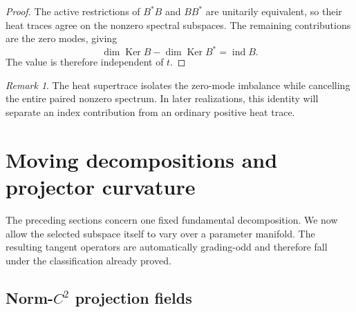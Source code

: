 \documentclass[11pt,reqno]{scrartcl}
\DeclareMathOperator{\Ker}{Ker}
\DeclareMathOperator{\ind}{ind}
\theoremstyle{plain}
\theoremstyle{definition}
\theoremstyle{remark}
\newtheorem{remark}[remark]{Remark}
\begin{document}
\begin{proof}
The active restrictions of \(B^*B\) and \(BB^*\) are unitarily equivalent,
so their heat traces agree on the nonzero spectral subspaces.  The remaining
contributions are the zero modes, giving
\begin{equation}
  \dim\Ker B-\dim\Ker B^*=\ind B.
\end{equation}
The value is therefore independent of \(t\).
\end{proof}

\begin{remark}
The heat supertrace isolates the zero-mode imbalance while cancelling the
entire paired nonzero spectrum.  In later realizations, this identity will
separate an index contribution from an ordinary positive heat trace.
\end{remark}


\section{Moving decompositions and projector curvature}
\label{sec:projector-geometry}

The preceding sections concern one fixed fundamental decomposition.  We now
allow the selected subspace itself to vary over a parameter manifold.  The
resulting tangent operators are automatically grading-odd and therefore fall
under the classification already proved.

\subsection{Norm-\texorpdfstring{\(C^2\)}{C2} projection fields}
\end{document}
